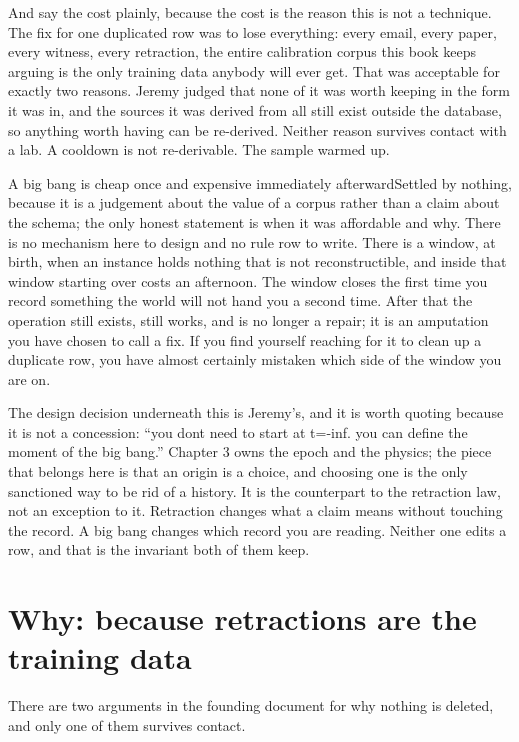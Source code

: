 And say the cost plainly, because the cost is the reason this is not a technique. The fix for one duplicated row was to lose everything: every email, every paper, every witness, every retraction, the entire calibration corpus this book keeps arguing is the only training data anybody will ever get. That was acceptable for exactly two reasons. Jeremy judged that none of it was worth keeping in the form it was in, and the sources it was derived from all still exist outside the database, so anything worth having can be re-derived. Neither reason survives contact with a lab. A cooldown is not re-derivable. The sample warmed up.

\begin{Open}{A big bang is cheap once and expensive immediately afterward}{Settled by nothing, because it is a judgement about the value of a corpus rather than a claim about the schema; the only honest statement is when it was affordable and why.}
There is no mechanism here to design and no rule row to write. There is a window, at birth, when an instance holds nothing that is not reconstructible, and inside that window starting over costs an afternoon. The window closes the first time you record something the world will not hand you a second time. After that the operation still exists, still works, and is no longer a repair; it is an amputation you have chosen to call a fix. If you find yourself reaching for it to clean up a duplicate row, you have almost certainly mistaken which side of the window you are on.
\end{Open}

The design decision underneath this is Jeremy's, and it is worth quoting because it is not a concession: ``you dont need to start at t=-inf. you can define the moment of the big bang.'' Chapter 3 owns the epoch and the physics; the piece that belongs here is that an origin is a choice, and choosing one is the only sanctioned way to be rid of a history. It is the counterpart to the retraction law, not an exception to it. Retraction changes what a claim means without touching the record. A big bang changes which record you are reading. Neither one edits a row, and that is the invariant both of them keep.

\section{Why: because retractions are the training data}

There are two arguments in the founding document for why nothing is deleted, and only one of them survives contact.

